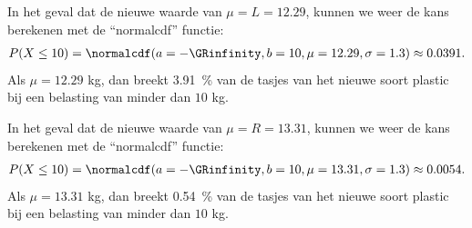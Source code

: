 \begin{enumerate}[label=(\alph*)]
{        In het geval dat de nieuwe waarde van $\mu=L=12.29$, kunnen we weer de kans berekenen met de \enquote{normalcdf} functie:
        \begin{align*}
            P(X \le 10) = \normalcdf(a=-\GRinfinity, b=10, \mu=12.29, \sigma=1.3) \approx 0.0391.
        \end{align*}
        Als $\mu=12.29$ kg, dan breekt \SI{3.91}{\percent} van de tasjes van het nieuwe soort plastic bij een belasting van minder dan $10$ kg.

        In het geval dat de nieuwe waarde van $\mu=R=13.31$, kunnen we weer de kans berekenen met de \enquote{normalcdf} functie:
        \begin{align*}
            P(X \le 10) = \normalcdf(a=-\GRinfinity, b=10, \mu=13.31, \sigma=1.3) \approx 0.0054.
        \end{align*}
        Als $\mu=13.31$ kg, dan breekt \SI{0.54}{\percent} van de tasjes van het nieuwe soort plastic bij een belasting van minder dan $10$ kg.
    }
\end{enumerate}
